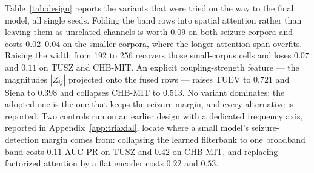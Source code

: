 Table~\ref{tab:design} reports the variants that were tried on the way
to the final model, all single seeds. Folding the band rows
into spatial attention rather than leaving them as unrelated channels is
worth $0.09$ on both seizure corpora and costs $0.02$--$0.04$ on the
smaller corpora, where the longer attention span overfits. Raising the
width from 192 to 256 recovers those small-corpus cells and loses
$0.07$ and $0.11$ on TUSZ and CHB-MIT. An explicit coupling-strength
feature --- the magnitudes $|Z_{ij}|$ projected onto the fused rows ---
raises TUEV to $0.721$ and Siena to $0.398$ and collapses CHB-MIT to
$0.513$. No variant dominates; the adopted one is the one that keeps the
seizure margin, and every alternative is reported. Two controls run on an earlier design with a dedicated frequency axis,
reported in Appendix~\ref{app:triaxial}, locate where a small model's
seizure-detection margin comes from: collapsing the learned filterbank to
one broadband band costs $0.11$ AUC-PR on TUSZ and $0.42$ on CHB-MIT, and
replacing factorized attention by a flat encoder costs $0.22$ and $0.53$.

\begin{table}[t]
\centering
\scriptsize
\caption{Design variants of the final model, primary metric per corpus, single seeds. ``fold'' = band rows folded into spatial attention; ``strength'' = explicit $|Z|$ feature.}
\label{tab:design}
\end{table}


